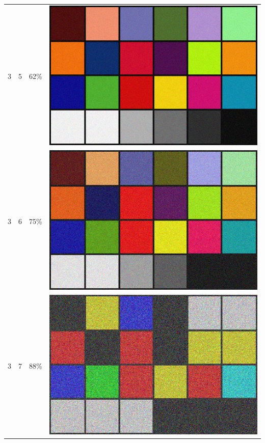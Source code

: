 \documentclass[times, utf8, seminar]{fer}
\begin{document}
\begin{center}
\begin{longtable}{|c|c|c|c|}
3 & 5 &62\% & \includegraphics[scale=0.3]{../benchmark_results/color_chart/3_components-5_bits.png} \\
3 & 6 &75\% & \includegraphics[scale=0.3]{../benchmark_results/color_chart/3_components-6_bits.png} \\
3 & 7 &88\% & \includegraphics[scale=0.3]{../benchmark_results/color_chart/3_components-7_bits.png} \\

\end{longtable}
\end{center}
\end{document}
